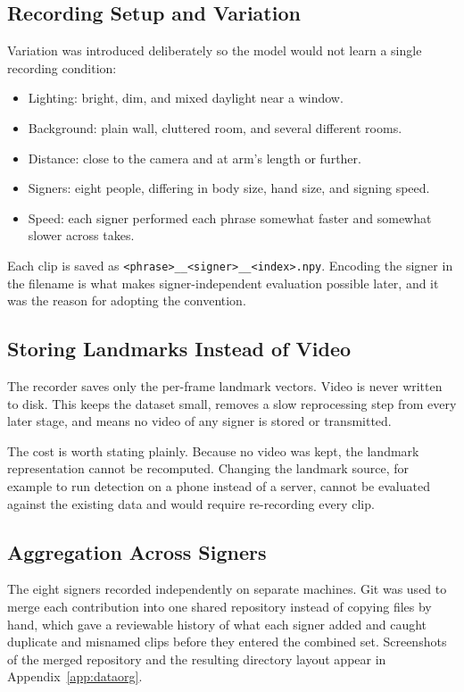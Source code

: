 \subsection{Recording Setup and Variation}

Variation was introduced deliberately so the model would not learn a single recording condition:

\begin{itemize}
    \item Lighting: bright, dim, and mixed daylight near a window.
    \item Background: plain wall, cluttered room, and several different rooms.
    \item Distance: close to the camera and at arm's length or further.
    \item Signers: eight people, differing in body size, hand size, and signing speed.
    \item Speed: each signer performed each phrase somewhat faster and somewhat slower across takes.
\end{itemize}

Each clip is saved as \texttt{<phrase>\_\_<signer>\_\_<index>.npy}. Encoding the signer in the filename is what makes signer-independent evaluation possible later, and it was the reason for adopting the convention.

\subsection{Storing Landmarks Instead of Video}

The recorder saves only the per-frame landmark vectors. Video is never written to disk. This keeps the dataset small, removes a slow reprocessing step from every later stage, and means no video of any signer is stored or transmitted.

The cost is worth stating plainly. Because no video was kept, the landmark representation cannot be recomputed. Changing the landmark source, for example to run detection on a phone instead of a server, cannot be evaluated against the existing data and would require re-recording every clip.

\subsection{Aggregation Across Signers}

The eight signers recorded independently on separate machines. Git was used to merge each contribution into one shared repository instead of copying files by hand, which gave a reviewable history of what each signer added and caught duplicate and misnamed clips before they entered the combined set. Screenshots of the merged repository and the resulting directory layout appear in Appendix~\ref{app:dataorg}.

